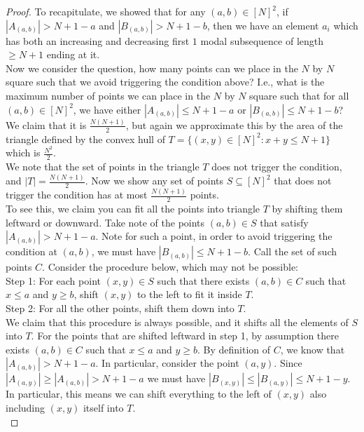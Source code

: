 \documentclass{article}
\begin{document}
\begin{proof}
To recapitulate, we showed that for any $(a,b) \in [N]^2$, if $|A_{(a,b)}| > N+1-a$ and $|B_{(a,b)}| > N+1-b$, then we have an element $a_i$ which has both an increasing and decreasing first $1$ modal subsequence of length $\geq N + 1$ ending at it. \\

Now we consider the question, how many points can we place in the $N$ by $N$ square such that we avoid triggering the condition above? I.e., what is the maximum number of points we can place in the $N$ by $N$ square such that for all $(a,b) \in [N]^2$, we have either $|A_{(a,b)}| \leq N+1-a$ or $|B_{(a,b)}| \leq N+1-b$? We claim that it is $\frac{N(N+1)}{2}$, but again we approximate this by the area of the triangle defined by the convex hull of $T = \{(x,y) \in [N]^2 : x + y \leq N+1\}$ which is $\frac{N^2}{2}$. \\

We note that the set of points in the triangle $T$ does not trigger the condition, and $|T| = \frac{N(N+1)}{2}$. Now we show any set of points $S \subseteq [N]^2$ that does not trigger the condition has at most $\frac{N(N+1)}{2}$ points. \\

To see this, we claim you can fit all the points into triangle $T$ by shifting them leftward or downward. Take note of the points $(a,b) \in S$ that satisfy $|A_{(a,b)}| > N+1-a$. Note for such a point, in order to avoid triggering the condition at $(a,b)$, we must have $|B_{(a,b)}| \leq N+1-b$. Call the set of such points $C$. Consider the procedure below, which may not be possible: \\

Step 1: For each point $(x,y) \in S$ such that there exists $(a,b) \in C$ such that $x \leq a$ and $y \geq b$, shift $(x,y)$ to the left to fit it inside $T$. \\

Step 2: For all the other points, shift them down into $T$. \\

We claim that this procedure is always possible, and it shifts all the elements of $S$ into $T$. For the points that are shifted leftward in step 1, by assumption there exists $(a,b) \in C$ such that $x \leq a$ and $y \geq b$. By definition of $C$, we know that $|A_{(a,b)}| > N+1-a$. In particular, consider the point $(a, y)$. Since $|A_{(a,y)}| \geq |A_{(a,b)}| > N+1-a$ we must have $|B_{(x,y)}| \leq |B_{(a,y)}| \leq N+1-y$. In particular, this means we can shift everything to the left of $(x,y)$ also including $(x,y)$ itself into $T$. \\


\end{proof}
\end{document}
